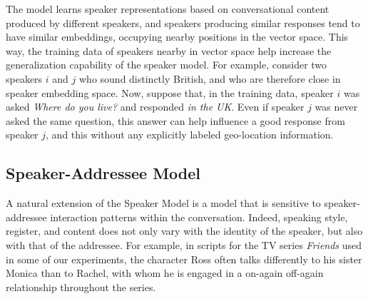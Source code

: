 The model learns speaker representations based on conversational content produced by different speakers, and speakers producing similar responses tend to have similar embeddings, occupying nearby positions in the vector space. 
This way, the training data of speakers nearby in vector space help increase the generalization capability of the
speaker model. For example, consider two speakers $i$ and $j$
who sound distinctly British, and who are therefore close in speaker 
embedding space. Now, suppose that, in the training data, speaker $i$ was asked {\it Where do you live?} and responded {\it in the UK}. Even if speaker $j$ was never asked the same question, this answer can help influence a good response from speaker $j$, and this without any explicitly labeled geo-location information.
  
\subsection{Speaker-Addressee Model}
A natural extension of the Speaker Model is a model that is sensitive to speaker-addressee interaction patterns within the conversation. Indeed,
speaking style, register, and content does not only vary with the identity of the speaker, but also with that of the addressee.
For example, in scripts for the TV series {\it Friends} used in some of our experiments, the character Ross often 
talks differently to his sister Monica than to Rachel,
with whom he is engaged in a on-again off-again relationship throughout the series. 

